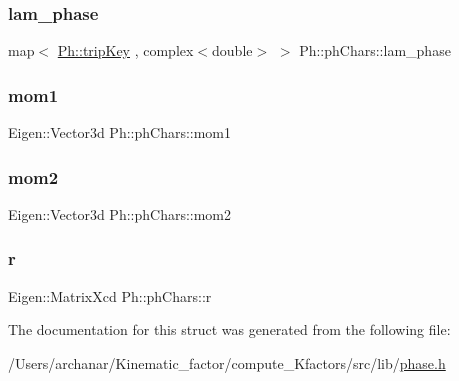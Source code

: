\subsubsection{\texorpdfstring{lam\_phase}{lam\_phase}\hspace{0.1cm}{\footnotesize\ttfamily [2/2]}}
{\footnotesize\ttfamily map$<$ \mbox{\hyperlink{namespacePh_afdd5bf3d7b37625115089ea3048e0cbb}{Ph\+::trip\+Key}} , complex$<$double$>$ $>$ Ph\+::ph\+Chars\+::lam\+\_\+phase}

\mbox{\label{structPh_1_1phChars_a3f4e550bbbc61af48cbe3c39bbea4147}} 
\subsubsection{\texorpdfstring{mom1}{mom1}}
{\footnotesize\ttfamily Eigen\+::\+Vector3d Ph\+::ph\+Chars\+::mom1}

\mbox{\label{structPh_1_1phChars_a1458e97056bb5c7a5f99a2b81e33eddc}} 
\subsubsection{\texorpdfstring{mom2}{mom2}}
{\footnotesize\ttfamily Eigen\+::\+Vector3d Ph\+::ph\+Chars\+::mom2}

\mbox{\label{structPh_1_1phChars_a953b0c01407ecc9b6ba27aa49a9f8587}} 
\subsubsection{\texorpdfstring{r}{r}}
{\footnotesize\ttfamily Eigen\+::\+Matrix\+Xcd Ph\+::ph\+Chars\+::r}



The documentation for this struct was generated from the following file\+:\begin{DoxyCompactItemize}
\item 
/\+Users/archanar/\+Kinematic\+\_\+factor/compute\+\_\+\+Kfactors/src/lib/\mbox{\hyperlink{src_2lib_2phase_8h}{phase.\+h}}\end{DoxyCompactItemize}
